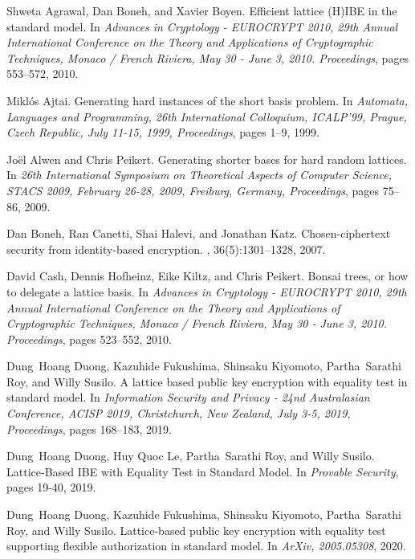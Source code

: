 \documentclass[runningheads,10pt]{llncs}
\begin{document}
\begin{thebibliography}{99}
	
	
	Shweta Agrawal, Dan Boneh, and Xavier Boyen.
	\newblock Efficient lattice {(H)IBE} in the standard model.
	\newblock In {\em Advances in Cryptology - {EUROCRYPT} 2010, 29th Annual
		International Conference on the Theory and Applications of Cryptographic
		Techniques, Monaco / French Riviera, May 30 - June 3, 2010. Proceedings},
	pages 553--572, 2010.
	
	Mikl{\'{o}}s Ajtai.
	\newblock Generating hard instances of the short basis problem.
	\newblock In {\em Automata, Languages and Programming, 26th International
		Colloquium, ICALP'99, Prague, Czech Republic, July 11-15, 1999, Proceedings},
	pages 1--9, 1999.
	
	Jo{\"{e}}l Alwen and Chris Peikert.
	\newblock Generating shorter bases for hard random lattices.
	\newblock In {\em 26th International Symposium on Theoretical Aspects of
		Computer Science, {STACS} 2009, February 26-28, 2009, Freiburg, Germany,
		Proceedings}, pages 75--86, 2009.
	
	Dan Boneh, Ran Canetti, Shai Halevi, and Jonathan Katz.
	\newblock Chosen-ciphertext security from identity-based encryption.
	, 36(5):1301--1328, 2007.
	
	David Cash, Dennis Hofheinz, Eike Kiltz, and Chris Peikert.
	\newblock Bonsai trees, or how to delegate a lattice basis.
	\newblock In {\em Advances in Cryptology - {EUROCRYPT} 2010, 29th Annual
		International Conference on the Theory and Applications of Cryptographic
		Techniques, Monaco / French Riviera, May 30 - June 3, 2010. Proceedings},
	pages 523--552, 2010.
	
	Dung~Hoang Duong, Kazuhide Fukushima, Shinsaku Kiyomoto, Partha~Sarathi Roy,
	and Willy Susilo.
	\newblock A lattice based public key encryption with equality test in standard
	model.
	\newblock In {\em Information Security and Privacy - 24nd Australasian
		Conference, {ACISP} 2019, Christchurch, New Zealand, July 3-5, 2019,
		Proceedings}, pages 168--183, 2019.
	
	Dung~Hoang Duong, Huy Quoc Le, Partha~Sarathi Roy, and Willy Susilo.
	\newblock Lattice-Based IBE with Equality Test in Standard Model.
	\newblock In {\em Provable Security}, pages 19-40, 2019.
	
	Dung~Hoang Duong, Kazuhide Fukushima, Shinsaku Kiyomoto, Partha~Sarathi Roy,
	and Willy Susilo.
	\newblock Lattice-based public key encryption with equality test
	supporting flexible authorization in standard model.
	\newblock In {\em ArXiv, 2005.05308}, 2020.
	

\end{thebibliography}
\end{document}
